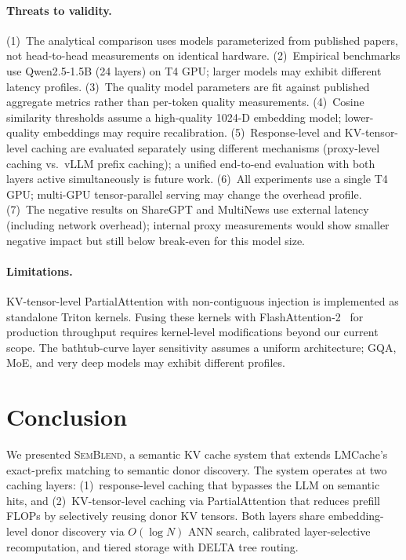 \documentclass[11pt,twocolumn]{article}
\newcommand{\semblend}{\textsc{SemBlend}\xspace}
\begin{document}
\paragraph{Threats to validity.}
(1)~The analytical comparison uses models parameterized from published
papers, not head-to-head measurements on identical hardware.
(2)~Empirical benchmarks use Qwen2.5-1.5B (24 layers) on T4 GPU;
larger models may exhibit different latency profiles.
(3)~The quality model parameters are fit against published aggregate
metrics rather than per-token quality measurements.
(4)~Cosine similarity thresholds assume a high-quality 1024-D
embedding model; lower-quality embeddings may require recalibration.
(5)~Response-level and KV-tensor-level caching are evaluated separately
using different mechanisms (proxy-level caching vs.\ vLLM prefix
caching); a unified end-to-end evaluation with both layers active
simultaneously is future work.
(6)~All experiments use a single T4 GPU; multi-GPU tensor-parallel
serving may change the overhead profile.
(7)~The negative results on ShareGPT and MultiNews use external
latency (including network overhead); internal proxy measurements
would show smaller negative impact but still below break-even for
this model size.

\paragraph{Limitations.}
KV-tensor-level PartialAttention with non-contiguous injection is
implemented as standalone Triton kernels. Fusing these kernels
with FlashAttention-2~\cite{flashattention} for production throughput
requires kernel-level modifications beyond our current scope. The
bathtub-curve layer sensitivity assumes a uniform architecture; GQA,
MoE, and very deep models may exhibit different profiles.


\section{Conclusion}
\label{sec:conclusion}

We presented \semblend, a semantic KV cache system that extends
LMCache's exact-prefix matching to semantic donor discovery. The system
operates at two caching layers: (1)~response-level caching that
bypasses the LLM on semantic hits, and (2)~KV-tensor-level caching
via PartialAttention that reduces prefill FLOPs by selectively reusing
donor KV tensors. Both layers share embedding-level donor discovery
via $O(\log N)$ ANN search, calibrated layer-selective recomputation,
and tiered storage with DELTA tree routing.
\end{document}
